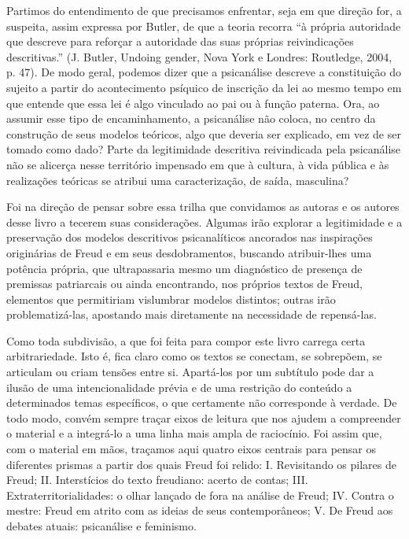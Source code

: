 Partimos do entendimento de que precisamos enfrentar, seja em que
direção for, a suspeita, assim expressa por Butler, de que a teoria
recorra ``à própria autoridade que descreve para reforçar a autoridade
das suas próprias reivindicações descritivas.'' (J. Butler, Undoing
gender, Nova York e Londres: Routledge, 2004, p. 47). De modo geral,
podemos dizer que a psicanálise descreve a constituição do sujeito a
partir do acontecimento psíquico de inscrição da lei ao mesmo tempo em
que entende que essa lei é algo vinculado ao pai ou à função paterna.
Ora, ao assumir esse tipo de encaminhamento, a psicanálise não coloca,
no centro da construção de seus modelos teóricos, algo que deveria ser
explicado, em vez de ser tomado como dado? Parte da legitimidade
descritiva reivindicada pela psicanálise não se alicerça nesse
território impensado em que à cultura, à vida pública e às realizações
teóricas se atribui uma caracterização, de saída, masculina?

Foi na direção de pensar sobre essa trilha que convidamos as autoras e
os autores desse livro a tecerem suas considerações. Algumas irão
explorar a legitimidade e a preservação dos modelos descritivos
psicanalíticos ancorados nas inspirações originárias de Freud e em seus
desdobramentos, buscando atribuir-lhes uma potência própria, que
ultrapassaria mesmo um diagnóstico de presença de premissas patriarcais
ou ainda encontrando, nos próprios textos de Freud, elementos que
permitiriam vislumbrar modelos distintos; outras irão problematizá-las,
apostando mais diretamente na necessidade de repensá-las.

\asterisc

Como toda subdivisão, a que foi feita para compor este livro carrega
certa arbitrariedade. Isto é, fica claro como os textos se conectam, se
sobrepõem, se articulam ou criam tensões entre si. Apartá-los por um
subtítulo pode dar a ilusão de uma intencionalidade prévia e de uma
restrição do conteúdo a determinados temas específicos, o que certamente
não corresponde à verdade. De todo modo, convém sempre traçar eixos de
leitura que nos ajudem a compreender o material e a integrá-lo a uma
linha mais ampla de raciocínio. Foi assim que, com o material em mãos,
traçamos aqui quatro eixos centrais para pensar os diferentes prismas a
partir dos quais Freud foi relido: I. Revisitando os pilares de Freud;
II. Interstícios do texto freudiano: acerto de contas; III.
Extraterritorialidades: o olhar lançado de fora na análise de Freud; IV.
Contra o mestre: Freud em atrito com as ideias de seus contemporâneos;
V. De Freud aos debates atuais: psicanálise e feminismo.

